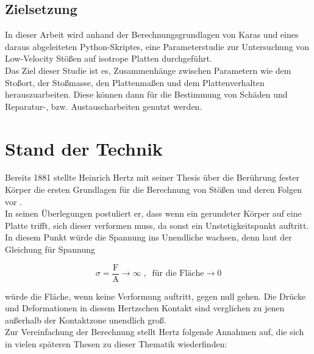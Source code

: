 \section*{Zielsetzung}
In dieser Arbeit wird anhand der Berechnungsgrundlagen von Karas und eines
daraus abgeleiteten Python-Skriptes, eine Parameterstudie zur Untersuchung von
Low-Velocity Stößen auf isotrope Platten durchgeführt. \\
Das Ziel dieser Studie ist es, Zusammenhänge zwischen Parametern wie dem Stoßort,
der Stoßmasse, den Plattenmaßen und dem Plattenverhalten herauszuarbeiten. Diese
können dann für die Bestimmung von Schäden und Reparatur-, bzw.
Austauscharbeiten genutzt werden.\\

\chapter{Stand der Technik}

Bereits 1881 stellte Heinrich Hertz mit seiner Thesis über die Berührung fester
Körper die ersten Grundlagen für die Berechnung von Stößen und deren Folgen vor
\cite{Hertz.1881}. \\
In seinen Überlegungen postuliert er, dass wenn ein gerundeter Körper auf eine
Platte trifft, sich dieser verformen muss, da sonst ein Unstetigkeitspunkt
auftritt. In diesem Punkt würde die Spannung ins Unendliche wachsen, denn laut
der Gleichung für Spannung 

\begin{equation}
\label{form:Druck}
\sigma = \frac{\mbox{F}}{\mbox{A}} \rightarrow \infty \; , \; \; \mbox{für die Fläche} \rightarrow 0
\end{equation}

würde die Fläche, wenn keine Verformung auftritt, gegen null gehen. Die Drücke
und Deformationen in diesem Hertzschen Kontakt sind verglichen zu jenen
außerhalb der Kontaktzone unendlich groß. \\
Zur Vereinfachung der Berechnung stellt Hertz folgende Annahmen auf, die sich in
vielen späteren Thesen zu dieser Thematik wiederfinden:

